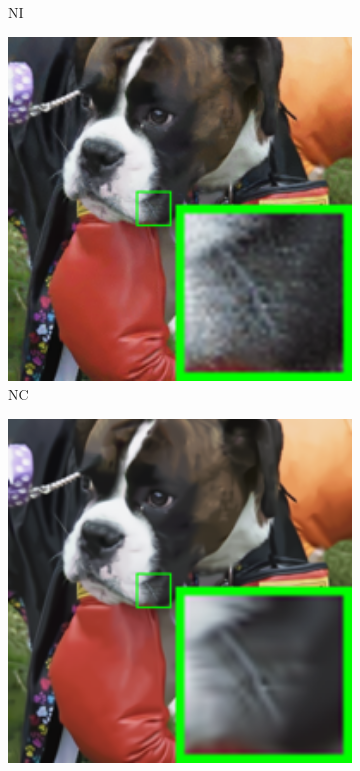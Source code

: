 \begin{figure}
\begin{subfigure}[t]{0.24\textwidth}
\caption{NI}
    \end{subfigure}
\hfill
    \begin{subfigure}[t]{0.24\textwidth}
        \centering
        \includegraphics[width=1\textwidth]{images/twsc/nc/resize_br_NC_dog.png}
		\caption{NC}
    \end{subfigure}
    \hfill
    \begin{subfigure}[t]{0.24\textwidth}
        \centering
        \includegraphics[width=1\textwidth]{images/twsc/nc/resize_br_TWSC_dog.png}

\end{subfigure}
\end{figure}
